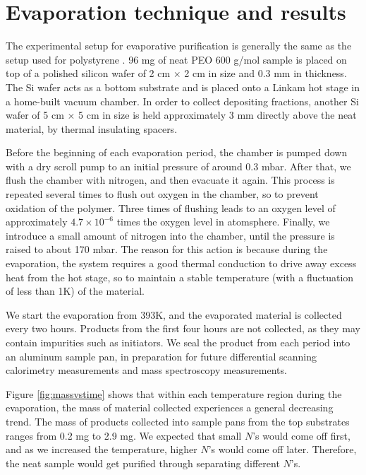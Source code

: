 \section{Evaporation technique and results}

The experimental setup for evaporative purification is generally the same as the setup used for polystyrene \cite{Zhu2017a}. 96 mg of neat PEO 600 g/mol sample is placed on top of a polished silicon wafer of 2 cm $\times$ 2 cm in size and 0.3 mm in thickness. The Si wafer acts as a bottom substrate and is placed onto a Linkam hot stage in a home-built vacuum chamber. In order to collect depositing fractions, another Si wafer of 5 cm $\times$ 5 cm in size is held approximately 3 mm directly above the neat material, by thermal insulating spacers.

Before the beginning of each evaporation period, the chamber is pumped down with a dry scroll pump to an initial pressure of around 0.3 mbar. After that, we flush the chamber with nitrogen, and then evacuate it again. This process is repeated several times to flush out oxygen in the chamber, so to prevent oxidation of the polymer. Three times of flushing leads to an oxygen level of approximately $4.7 \times 10^{-6}$ times the oxygen level in atomsphere. %
Finally, we introduce a small amount of nitrogen into the chamber, until the pressure is raised to about 170 mbar. The reason for this action is because during the evaporation, the system requires a good thermal conduction to drive away excess heat from the hot stage, so to maintain a stable temperature (with a fluctuation of less than 1K) of the material.

We start the evaporation from 393K, and the evaporated material is collected every two hours. Products from the first four hours are not collected, as they may contain impurities such as initiators. We seal the product from each period into an aluminum sample pan, in preparation for future differential scanning calorimetry measurements and mass spectroscopy measurements.

Figure \ref{fig:massvstime} shows that within each temperature region during the evaporation, the mass of material collected experiences a general decreasing trend. The mass of products collected into sample pans from the top substrates ranges from 0.2 mg to 2.9 mg. We expected that small $N$'s would come off first, and as we increased the temperature, higher $N$'s would come off later. Therefore, the neat sample would get purified through separating different $N$'s.

